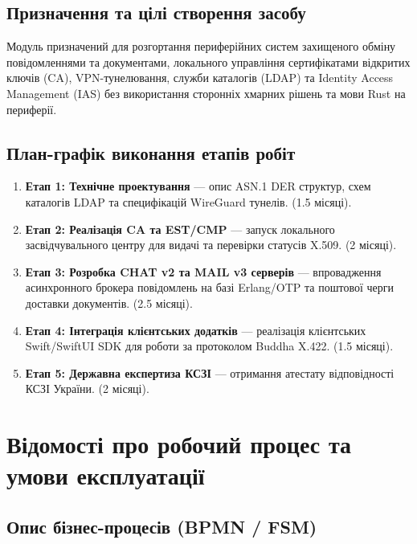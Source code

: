 \documentclass{article}
\begin{document}
\subsection{Призначення та цілі створення засобу}
Модуль призначений для розгортання периферійних систем захищеного обміну повідомленнями та документами,
локального управління сертифікатами відкритих ключів (CA), VPN-тунелювання, служби каталогів (LDAP) та
Identity Access Management (IAS) без використання сторонніх хмарних рішень та мови Rust на периферії.

\subsection{План-графік виконання етапів робіт}
\begin{enumerate}
    \item \textbf{Етап 1: Технічне проектування} --- опис ASN.1 DER структур, схем каталогів LDAP та специфікацій WireGuard тунелів. (1.5 місяці).
    \item \textbf{Етап 2: Реалізація CA та EST/CMP} --- запуск локального засвідчувального центру для видачі та перевірки статусів X.509. (2 місяці).
    \item \textbf{Етап 3: Розробка CHAT v2 та MAIL v3 серверів} --- впровадження асинхронного брокера повідомлень на базі Erlang/OTP та поштової черги доставки документів. (2.5 місяці).
    \item \textbf{Етап 4: Інтеграція клієнтських додатків} --- реалізація клієнтських Swift/SwiftUI SDK для роботи за протоколом Buddha X.422. (1.5 місяці).
    \item \textbf{Етап 5: Державна експертиза КСЗІ} --- отримання атестату відповідності КСЗІ України. (2 місяці).
\end{enumerate}

\newpage
\section{Відомості про робочий процес та умови експлуатації}

\subsection{Опис бізнес-процесів (BPMN / FSM)}
\end{document}
